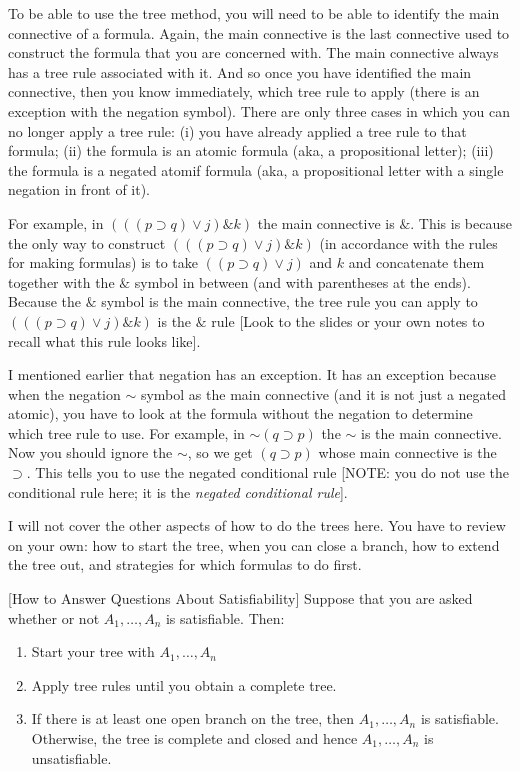 \documentclass[
]{book}
\providecommand{\tightlist}{%
  \setlength{\itemsep}{0pt}\setlength{\parskip}{0pt}}
\begin{document}
To be able to use the tree method, you will need to be able to identify the main connective of a formula. Again, the main connective is the last connective used to construct the formula that you are concerned with. The main connective always has a tree rule associated with it. And so once you have identified the main connective, then you know immediately, which tree rule to apply (there is an exception with the negation symbol). There are only three cases in which you can no longer apply a tree rule: (i) you have already applied a tree rule to that formula; (ii) the formula is an atomic formula (aka, a propositional letter); (iii) the formula is a negated atomif formula (aka, a propositional letter with a single negation in front of it).

For example, in \((((p \supset q) \lor j) \& k)\) the main connective is \(\&\). This is because the only way to construct \((((p \supset q) \lor j) \& k)\) (in accordance with the rules for making formulas) is to take \(((p \supset q) \lor j)\) and \(k\) and concatenate them together with the \(\&\) symbol in between (and with parentheses at the ends). Because the \(\&\) symbol is the main connective, the tree rule you can apply to \((((p \supset q) \lor j) \& k)\) is the \(\&\) rule {[}Look to the slides or your own notes to recall what this rule looks like{]}.

I mentioned earlier that negation has an exception. It has an exception because when the negation \(\sim\) symbol as the main connective (and it is not just a negated atomic), you have to look at the formula without the negation to determine which tree rule to use. For example, in \(\sim (q \supset p)\) the \(\sim\) is the main connective. Now you should ignore the \(\sim\), so we get \((q \supset p)\) whose main connective is the \(\supset\). This tells you to use the negated conditional rule {[}NOTE: you do not use the conditional rule here; it is the \emph{negated conditional rule}{]}.

I will not cover the other aspects of how to do the trees here. You have to review on your own: how to start the tree, when you can close a branch, how to extend the tree out, and strategies for which formulas to do first.

{[}How to Answer Questions About Satisfiability{]} Suppose that you are asked whether or not \(A_1,\ldots,A_n\) is satisfiable. Then:

\begin{enumerate}
\def\labelenumi{\arabic{enumi}.}
\tightlist
\item
  Start your tree with \(A_1,\ldots,A_n\)
\item
  Apply tree rules until you obtain a complete tree.
\item
  If there is at least one open branch on the tree, then \(A_1,\ldots,A_n\) is satisfiable. Otherwise, the tree is complete and closed and hence \(A_1,\ldots,A_n\) is unsatisfiable.
\end{enumerate}
\end{document}
